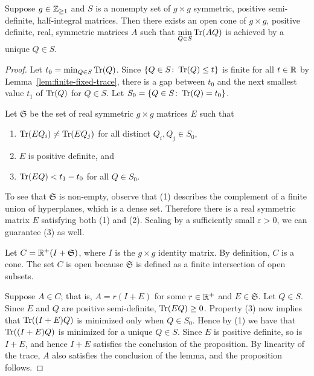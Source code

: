 \documentclass{amsart}
\begin{document}
\begin{proposition}\label{prop:unique-minimizer}
  Suppose $g\in\mathbb{Z}_{\ge 1}$ and $S$ is a nonempty set of $g \times g$ symmetric, positive semi-definite, half-integral matrices. Then there exists an open cone of $g \times g$, positive definite, real, symmetric matrices $A$ such that $\displaystyle\min_{Q \in S}\operatorname{Tr}(AQ)$ is achieved by a unique $Q\in S$.
\end{proposition}
\begin{proof}
Let $t_0 = \min_{Q \in S}\operatorname{Tr}(Q)$.
  Since $\{Q \in S \colon \operatorname{Tr}(Q) \leq t\}$ is finite for all $t \in \mathbb{R}$ by Lemma~\ref{lem:finite-fixed-trace},
  there is a gap between $t_0$ and the next smallest value $t_1$ of $\operatorname{Tr}(Q)$ for $Q \in S$. Let $S_0 = \{Q \in S \colon \operatorname{Tr}(Q) = t_0\}$.

  Let $\mathfrak{S}$ be the set of real symmetric $g \times g$ matrices $E$ such that
  \begin{enumerate}
    \item $\operatorname{Tr}(EQ_i) \neq \operatorname{Tr}(EQ_j)$ for all distinct $Q_i,Q_j \in S_0$,
    \item $E$ is positive definite, and
    \item $\operatorname{Tr}(EQ) < t_1 - t_0$ for all $Q\in S_0$.
  \end{enumerate}
  To see that $\mathfrak{S}$ is non-empty, observe that (1) describes the complement of a finite union of hyperplanes, which is a dense set. Therefore there is a real symmetric matrix $E$ satisfying both (1) and (2). Scaling by a sufficiently small $\varepsilon > 0$, we can guarantee (3) as well.

  Let $C = \mathbb{R}^+(I + \mathfrak{S})$, where $I$ is the $g \times g$ identity matrix. By definition, $C$ is a cone. The set $C$ is open because $\mathfrak{S}$ is defined as a finite intersection of open subsets.

  Suppose $A \in C$; that is, $A = r(I+E)$ for some $r \in \mathbb{R}^+$ and $E \in \mathfrak{S}$. Let $Q \in S$. Since $E$ and $Q$ are positive semi-definite, $\operatorname{Tr}(EQ)\ge 0$. Property (3) now implies that $\operatorname{Tr}((I+E)Q)$ is minimized only when $Q \in S_0$. Hence by (1) we have that $\operatorname{Tr}((I+E)Q)$ is minimized for a unique $Q \in S$. Since $E$ is positive definite, so is $I+E$, and hence $I + E$ satisfies the conclusion of the proposition. By linearity of the trace, $A$ also satisfies the conclusion of the lemma, and the proposition follows.
\end{proof}
\end{document}
